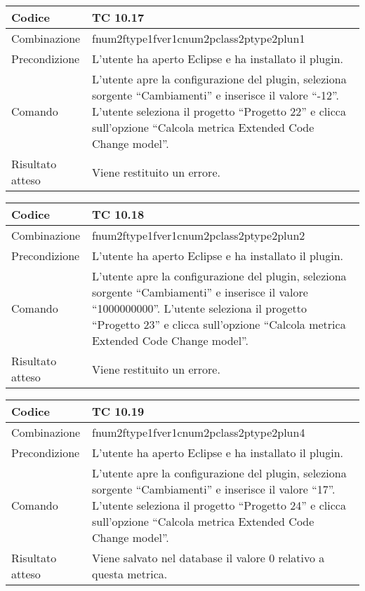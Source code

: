 \begin{table}[ht]
\begin{tabular}{|p{3cm}|p{9cm}|}
\hline
\cellcolor{lightgray}Codice				& TC 10.17								\\
\hline
\cellcolor{lightgray}Combinazione		& fnum2ftype1fver1cnum2pclass2ptype2plun1									\\
\hline
\cellcolor{lightgray}Precondizione		& L'utente ha aperto Eclipse e ha installato il plugin.		\\
\hline
\cellcolor{lightgray}Comando			& L'utente apre la configurazione del plugin, seleziona sorgente ``Cambiamenti'' e inserisce il valore ``-12''. L'utente seleziona il progetto ``Progetto 22''  e clicca sull'opzione ``Calcola metrica Extended Code Change model''.	\\
\hline
\cellcolor{lightgray}Risultato atteso	& Viene restituito un errore.\\
\hline
\end{tabular}
\end{table}

\begin{table}[ht]
\begin{tabular}{|p{3cm}|p{9cm}|}
\hline
\cellcolor{lightgray}Codice				& TC 10.18								\\
\hline
\cellcolor{lightgray}Combinazione		& fnum2ftype1fver1cnum2pclass2ptype2plun2									\\
\hline
\cellcolor{lightgray}Precondizione		& L'utente ha aperto Eclipse e ha installato il plugin.		\\
\hline
\cellcolor{lightgray}Comando			& L'utente apre la configurazione del plugin, seleziona sorgente ``Cambiamenti'' e inserisce il valore ``1000000000''. L'utente seleziona il progetto ``Progetto 23''  e clicca sull'opzione ``Calcola metrica Extended Code Change model''.	\\
\hline
\cellcolor{lightgray}Risultato atteso	& Viene restituito un errore.\\
\hline
\end{tabular}
\end{table}


\begin{table}[ht]
\begin{tabular}{|p{3cm}|p{9cm}|}
\hline
\cellcolor{lightgray}Codice				& TC 10.19								\\
\hline
\cellcolor{lightgray}Combinazione		& fnum2ftype1fver1cnum2pclass2ptype2plun4									\\
\hline
\cellcolor{lightgray}Precondizione		& L'utente ha aperto Eclipse e ha installato il plugin.		\\
\hline
\cellcolor{lightgray}Comando			& L'utente apre la configurazione del plugin, seleziona sorgente ``Cambiamenti'' e inserisce il valore ``17''. L'utente seleziona il progetto ``Progetto 24''  e clicca sull'opzione ``Calcola metrica Extended Code Change model''.	\\
\hline
\cellcolor{lightgray}Risultato atteso	& Viene salvato nel database il valore 0 relativo a questa metrica.\\
\hline
\end{tabular}
\end{table}

